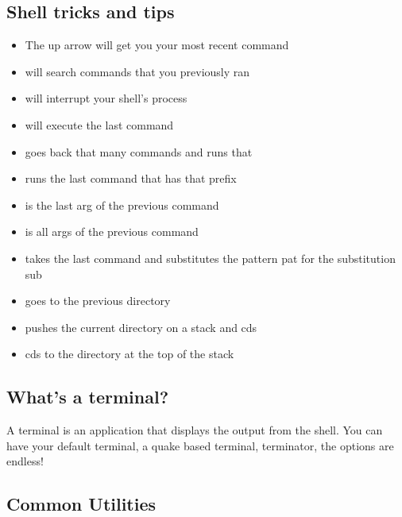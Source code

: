 \subsection{Shell tricks and tips}

\begin{itemize}
\item The up arrow will get you your most recent command
\item {} will search commands that you previously ran
\item {} will interrupt your shell's process
\item \keyword{!!} will execute the last command
\item {} goes back that many commands and runs that
\item {} runs the last command that has that prefix
\item \keyword{!\$} is the last arg of the previous command
\item \keyword{!*} is all args of the previous command
\item {} takes the last command and substitutes the pattern pat for the substitution sub
\item {} goes to the previous directory
\item {} pushes the current directory on a stack and cds
\item {} cds to the directory at the top of the stack
\end{itemize}

\subsection{What's a terminal?}

A terminal is an application that displays the output from the shell. You can have your default terminal, a quake based terminal, terminator, the options are endless!

\subsection{Common Utilities}

